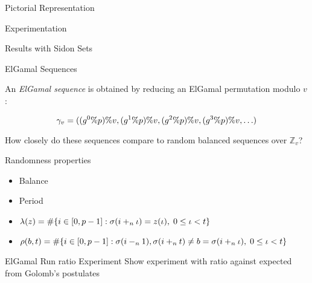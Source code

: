 \begin{frame}{Pictorial Representation}
\end{frame}

\begin{frame}{Experimentation}
\end{frame}

\begin{frame}{Results with Sidon Sets}
\end{frame}

\begin{frame}{ElGamal Sequences}

An {\em ElGamal sequence} is obtained by reducing an ElGamal permutation modulo $v$:
  
  \[\gamma_v = ((g^0\% p)\% v,(g^1\% p)\% v,(g^2\% p)\% v,(g^3\% p)\% v,\ldots)\]

  How closely do these sequences compare to random balanced sequences over $\mathbb{Z}_v$?

\end{frame}

\begin{frame}{Randomness properties}
  \begin{itemize}
  \item Balance
  \item Period
  \item   $\lambda(z) = \#{\{i \in [0,p-1]: \sigma(i+_{n} \iota) = z(\iota),\; 0 \leq \iota < t\}}$
    \item  $\rho(b,t) = \#{ \{i \in [0,p-1]: \sigma(i-_{n} 1),\sigma(i+_n t) \neq b = \sigma(i+_n\iota),\; 0 \leq \iota < t\}}$
    \end{itemize}
  
  \end{frame}


\begin{frame}{ElGamal Run ratio Experiment}
    Show experiment with ratio against expected from Golomb's postulates
\end{frame}



 	

